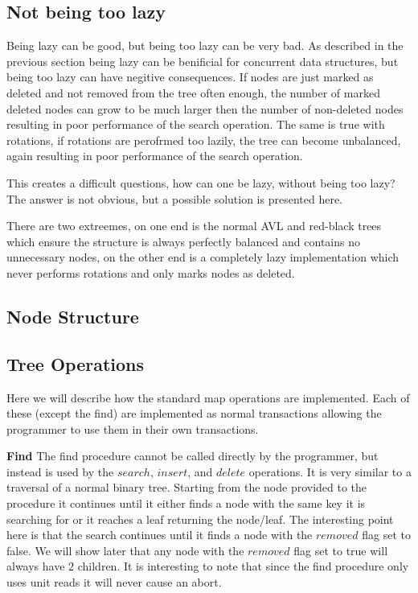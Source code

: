 \documentclass[10pt]{sigplanconf}
\begin{document}
\subsection{Not being too lazy}
Being lazy can be good, but being too lazy can be very bad.
As described in the previous section being lazy can be benificial for concurrent data structures, but being too lazy can have negitive consequences.
If nodes are just marked as deleted and not removed from the tree often enough, the number of marked deleted nodes can grow to be much larger then the
number of non-deleted nodes resulting in poor performance of the search operation.
The same is true with rotations, if rotations are perofrmed too lazily, the tree can become unbalanced, again resulting in poor performance of the search operation.

This creates a difficult questions, how can one be lazy, without being too lazy?
The answer is not obvious, but a possible solution is presented here.

There are two extreemes, on one end is the normal AVL and red-black trees which ensure the structure is always perfectly balanced and contains no unnecessary nodes, on the other end is a completely
lazy implementation which never performs rotations and only marks nodes as deleted.

\subsection{Node Structure}

\subsection{Tree Operations}
Here we will describe how the standard map operations are implemented.
Each of these (except the find) are implemented as normal transactions allowing the programmer to use them in their own transactions.

{\bf Find} The find procedure cannot be called directly by the programmer, but instead is used by the $search$, $insert$, and $delete$ operations.
It is very similar to a traversal of a normal binary tree.
Starting from the node provided to the procedure it continues until it either finds a node with the same key it is searching for or it reaches a leaf returning the node/leaf.
The interesting point here is that the search continues until it finds a node with the $removed$ flag set to false.
We will show later that any node with the $removed$ flag set to true will always have $2$ children.
It is interesting to note that since the find procedure only uses unit reads it will never cause an abort.
\end{document}
